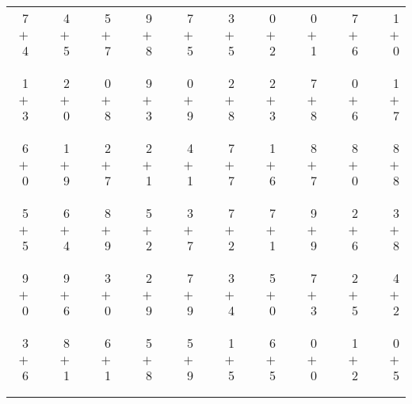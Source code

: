 \documentclass[12pt, letterpaper]{article}
\begin{document}
\begin{tabular}{rrrrrrrrrrrrrrrrrrr}
7 & & 4 & & 5 & & 9 & & 7 & & 3 & & 0 & & 0 & & 7 & & 1\\
$+$ 4 & & $+$ 5 & & $+$ 7 & & $+$ 8 & & $+$ 5 & & $+$ 5 & & $+$ 2 & & $+$ 1 & & $+$ 6 & & $+$ 0\\
\cline{1-1} \cline{3-3} \cline{5-5} \cline{7-7} \cline{9-9} \cline{11-11} \cline{13-13} \cline{15-15} \cline{17-17} \cline{19-19} \\ \\
1 & & 2 & & 0 & & 9 & & 0 & & 2 & & 2 & & 7 & & 0 & & 1\\
$+$ 3 & & $+$ 0 & & $+$ 8 & & $+$ 3 & & $+$ 9 & & $+$ 8 & & $+$ 3 & & $+$ 8 & & $+$ 6 & & $+$ 7\\
\cline{1-1} \cline{3-3} \cline{5-5} \cline{7-7} \cline{9-9} \cline{11-11} \cline{13-13} \cline{15-15} \cline{17-17} \cline{19-19} \\ \\
6 & & 1 & & 2 & & 2 & & 4 & & 7 & & 1 & & 8 & & 8 & & 8\\
$+$ 0 & & $+$ 9 & & $+$ 7 & & $+$ 1 & & $+$ 1 & & $+$ 7 & & $+$ 6 & & $+$ 7 & & $+$ 0 & & $+$ 8\\
\cline{1-1} \cline{3-3} \cline{5-5} \cline{7-7} \cline{9-9} \cline{11-11} \cline{13-13} \cline{15-15} \cline{17-17} \cline{19-19} \\ \\
5 & & 6 & & 8 & & 5 & & 3 & & 7 & & 7 & & 9 & & 2 & & 3\\
$+$ 5 & & $+$ 4 & & $+$ 9 & & $+$ 2 & & $+$ 7 & & $+$ 2 & & $+$ 1 & & $+$ 9 & & $+$ 6 & & $+$ 8\\
\cline{1-1} \cline{3-3} \cline{5-5} \cline{7-7} \cline{9-9} \cline{11-11} \cline{13-13} \cline{15-15} \cline{17-17} \cline{19-19} \\ \\
9 & & 9 & & 3 & & 2 & & 7 & & 3 & & 5 & & 7 & & 2 & & 4\\
$+$ 0 & & $+$ 6 & & $+$ 0 & & $+$ 9 & & $+$ 9 & & $+$ 4 & & $+$ 0 & & $+$ 3 & & $+$ 5 & & $+$ 2\\
\cline{1-1} \cline{3-3} \cline{5-5} \cline{7-7} \cline{9-9} \cline{11-11} \cline{13-13} \cline{15-15} \cline{17-17} \cline{19-19} \\ \\
3 & & 8 & & 6 & & 5 & & 5 & & 1 & & 6 & & 0 & & 1 & & 0\\
$+$ 6 & & $+$ 1 & & $+$ 1 & & $+$ 8 & & $+$ 9 & & $+$ 5 & & $+$ 5 & & $+$ 0 & & $+$ 2 & & $+$ 5\\
\cline{1-1} \cline{3-3} \cline{5-5} \cline{7-7} \cline{9-9} \cline{11-11} \cline{13-13} \cline{15-15} \cline{17-17} \cline{19-19} \\ \\

\end{tabular}
\end{document}
